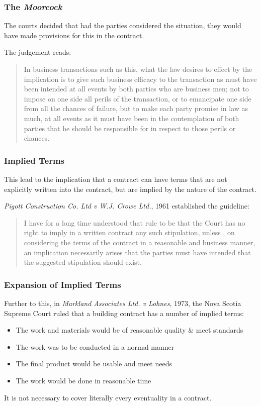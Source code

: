 \begin{frame}
\frametitle{The \textit{Moorcock}}

The courts decided that had the parties considered the situation, they would have made provisions for this in the contract.

The judgement reads:

\begin{quote}
   In business transactions such as this, what the law desires to effect by the implication is to give such business efficacy to the transaction as must have been intended at all events by both parties who are business men; not to impose on one side all perils of the transaction, or to emancipate one side from all the chances of failure, but to make each party promise in law as much, at all events as it must have been in the contemplation of both parties that he should be responsible for in respect to those perils or chances.
\end{quote}


\end{frame}



\begin{frame}
\frametitle{Implied Terms}

This lead to the implication that a contract can have terms that are not explicitly written into the contract, but are implied by the nature of the contract.

\textit{Pigott Construction Co. Ltd v W.J. Crowe Ltd.}, 1961 established the guideline:

\begin{quote}
   I have for a long time understood that rule to be that the Court has no right to imply in a written contract any such stipulation, unless , on considering the terms of the contract in a reasonable and business manner, an implication necessarily arises that the parties must have intended that the suggested stipulation should exist.
\end{quote}

\end{frame}



\begin{frame}
\frametitle{Expansion of Implied Terms}

Further to this, in \textit{Markland Associates Ltd. v Lohnes}, 1973, the Nova Scotia Supreme Court ruled that a building contract has a number of implied terms:

\begin{itemize}
\item The work and materials would be of reasonable quality \& meet standards
\item The work was to be conducted in a normal manner
\item The final product would be usable and meet needs
\item The work would be done in reasonable time
\end{itemize}

It is not necessary to cover literally every eventuality in a contract.

\end{frame}



